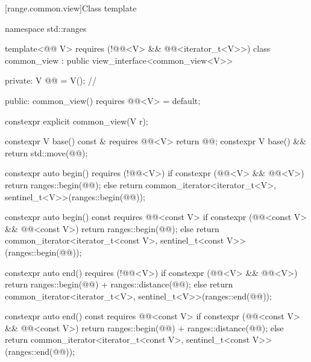[range.common.view]{Class template }

%
%
%
%
%
\begin{codeblock}
namespace std::ranges {
  template<@@ V>
    requires (!@@<V> && @@<iterator_t<V>>)
  class common_view : public view_interface<common_view<V>> {
  private:
    V @@ = V();  // \expos

  public:
    common_view() requires @@<V> = default;

    constexpr explicit common_view(V r);

    constexpr V base() const & requires @@<V> { return @@; }
    constexpr V base() && { return std::move(@@); }

    constexpr auto begin() requires (!@@<V>) {
      if constexpr (@@<V> && @@<V>)
        return ranges::begin(@@);
      else
        return common_iterator<iterator_t<V>, sentinel_t<V>>(ranges::begin(@@));
    }

    constexpr auto begin() const requires @@<const V> {
      if constexpr (@@<const V> && @@<const V>)
        return ranges::begin(@@);
      else
        return common_iterator<iterator_t<const V>, sentinel_t<const V>>(ranges::begin(@@));
    }

    constexpr auto end() requires (!@@<V>) {
      if constexpr (@@<V> && @@<V>)
        return ranges::begin(@@) + ranges::distance(@@);
      else
        return common_iterator<iterator_t<V>, sentinel_t<V>>(ranges::end(@@));
    }

    constexpr auto end() const requires @@<const V> {
      if constexpr (@@<const V> && @@<const V>)
        return ranges::begin(@@) + ranges::distance(@@);
      else
        return common_iterator<iterator_t<const V>, sentinel_t<const V>>(ranges::end(@@));
    }

}}
\end{codeblock}
